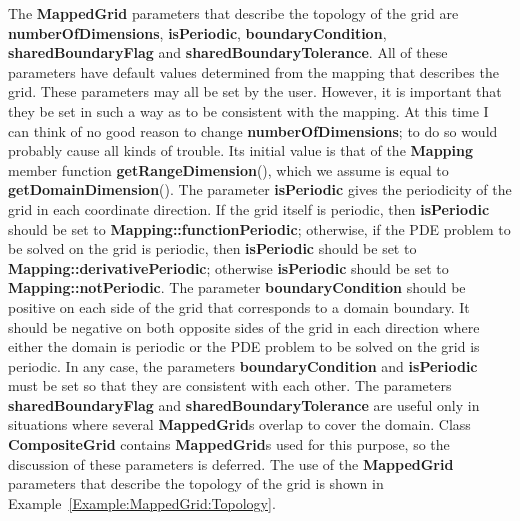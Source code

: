 \documentclass{article}
\begin{document}

The \textbf{MappedGrid} parameters that describe the topology of the grid are \textbf{numberOfDimensions},
\textbf{isPeriodic}, \textbf{boundaryCondition}, \textbf{sharedBoundaryFlag} and \textbf{sharedBoundaryTolerance}.
All of these parameters have default values determined from the mapping that describes the grid.  These parameters may all be
set by the user.  However, it is important that they be set in such a way as to be consistent with the mapping.  At this time
I can think of no good reason to change \textbf{numberOfDimensions}; to do so would probably cause all kinds of trouble.
Its initial value is that of the \textbf{Mapping} member function \textbf{getRangeDimension}(), which we assume is equal
to \textbf{getDomainDimension}().  The parameter \textbf{isPeriodic} gives the periodicity of the grid in each coordinate
direction.  If the grid itself is periodic, then \textbf{isPeriodic} should be set to \textbf{Mapping::functionPeriodic};
otherwise, if the PDE problem to be solved on the grid is periodic, then \textbf{isPeriodic} should be set to
\textbf{Mapping::derivativePeriodic}; otherwise \textbf{isPeriodic} should be set to \textbf{Mapping::notPeriodic}.
The parameter \textbf{boundaryCondition} should be positive on each side of the grid that corresponds to a domain boundary.
It should be negative on both opposite sides of the grid in each direction where either the domain is periodic or the PDE
problem to be solved on the grid is periodic.  In any case, the parameters \textbf{boundaryCondition} and
\textbf{isPeriodic} must be set so that they are consistent with each other.  The parameters \textbf{sharedBoundaryFlag}
and \textbf{sharedBoundaryTolerance} are useful only in situations where several \textbf{MappedGrid}s overlap to cover
the domain.  Class \textbf{CompositeGrid} contains \textbf{MappedGrid}s used for this purpose, so the discussion of these
parameters is deferred.  The use of the \textbf{MappedGrid} parameters that describe the topology of the grid is shown in
Example~\ref{Example:MappedGrid:Topology}.
\end{document}
